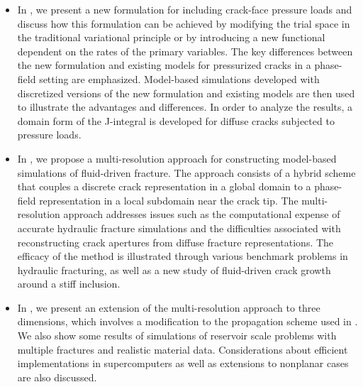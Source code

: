 \begin{itemize}
  \item %
        In , we present a new formulation for including crack-face pressure loads and discuss how this formulation can be achieved by modifying the trial space in the traditional variational principle or by introducing a new functional dependent on the rates of the primary variables. The key differences between the new formulation and existing models for pressurized cracks in a phase-field setting are emphasized. Model-based simulations developed with discretized versions of the new formulation and existing models are then used to illustrate the advantages and differences. In order to analyze the results, a domain form of the J-integral is developed for diffuse cracks subjected to pressure loads.
  \item %
        In , we propose a multi-resolution approach for constructing model-based simulations of fluid-driven fracture. The approach consists of a hybrid scheme that couples a discrete crack representation in a global domain to a phase-field representation in a local subdomain near the crack tip. The multi-resolution approach addresses issues such as the computational expense of accurate hydraulic fracture simulations and the difficulties associated with reconstructing crack apertures from diffuse fracture representations. The efficacy of the method is illustrated through various benchmark problems in hydraulic fracturing, as well as a new study of fluid-driven crack growth around a stiff inclusion.
  \item %
        In , we present an extension of the multi-resolution approach to three dimensions, which involves a modification to the propagation scheme used in . We also show some results of simulations of reservoir scale problems with multiple fractures and realistic material data. Considerations about efficient implementations in supercomputers as well as extensions to nonplanar cases are also discussed.
\end{itemize}
